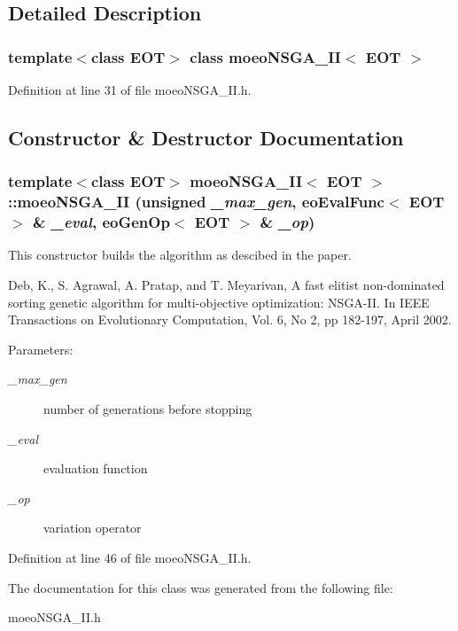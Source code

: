 \subsection{Detailed Description}
\subsubsection*{template$<$class EOT$>$ class moeo\-NSGA\_\-II$<$ EOT $>$}





Definition at line 31 of file moeo\-NSGA\_\-II.h.

\subsection{Constructor \& Destructor Documentation}
\subsubsection{\setlength{\rightskip}{0pt plus 5cm}template$<$class EOT$>$ {\bf moeo\-NSGA\_\-II}$<$ EOT $>$::{\bf moeo\-NSGA\_\-II} (unsigned {\em \_\-max\_\-gen}, {\bf eo\-Eval\-Func}$<$ EOT $>$ \& {\em \_\-eval}, {\bf eo\-Gen\-Op}$<$ EOT $>$ \& {\em \_\-op})\hspace{0.3cm}{\tt  [inline]}}\label{classmoeoNSGA__II_bdbf13431487a83afdfd4f527f99ebcf}


This constructor builds the algorithm as descibed in the paper. 

Deb, K., S. Agrawal, A. Pratap, and T. Meyarivan, A fast elitist non-dominated sorting genetic algorithm for multi-objective optimization: NSGA-II. In IEEE Transactions on Evolutionary Computation, Vol. 6, No 2, pp 182-197, April 2002. \begin{Desc}
\item[Parameters:]
\begin{description}
\item[{\em \_\-max\_\-gen}]number of generations before stopping \item[{\em \_\-eval}]evaluation function \item[{\em \_\-op}]variation operator \end{description}
\end{Desc}


Definition at line 46 of file moeo\-NSGA\_\-II.h.

The documentation for this class was generated from the following file:\begin{CompactItemize}
\item 
moeo\-NSGA\_\-II.h\end{CompactItemize}
